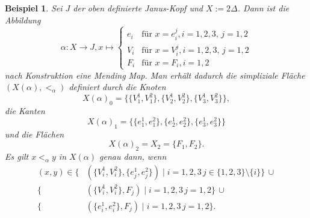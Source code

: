 \documentclass[12pt,titlepage,twoside,cleardoublepage]{article}
\theoremstyle{nummermitklammern}
\newtheorem{bsp}[temp]{Beispiel}
\newtheorem{bsp}[zahl]{Beispiel}
\numberwithin{equation}{section}
\begin{document}
  \begin{bsp}
  Sei $J$ der oben definierte Janus-Kopf und $X:= 2\Delta$. Dann ist die Abbildung 
  \[
  \alpha: X \to J, x \mapsto 
  \begin{cases}
e_i & \text{für } x =e_i^j ,i=1,2,3,\,j=1,2\\
V_i &\text{für } x =V_i^j,i=1,2,3,\,j=1,2\\
F_i &\text{für } x=F_i , i=1,2 
\end{cases}
  \]
  nach Konstruktion eine Mending Map. Man erhält dadurch die simpliziale Fläche $(X(\alpha),<_\alpha)$ definiert durch die Knoten
  \[
  X(\alpha)_0=\{\{V_1^1,V_1^2\},\{V_2^1,V_2^2\},\{V_3^1,V_3^2\}\},
  \]
  die Kanten
  \[
  X(\alpha)_1=\{\{e_1^1,e_1^2\},\{e_2^1,e_2^2\},\{e_3^1,e_3^2\}\}
  \]
  und die Flächen 
  \[
X(\alpha)_2=X_2=\{F_1,F_2\} .
  \]
  Es gilt $x<_{\alpha}y$ in $X(\alpha)$ genau dann, wenn
  \begin{align*}
 (x,y) \in \{&(\{V_i^1,V_i^2\}, \{e_j^1,e_j^2\})\mid i=1,2,3 \, j\in\{1,2,3\} \setminus \{i\}\}\, \cup\\
  \{&(\{V_i^1,V_i^2\}, F_j)\mid i=1,2,3 \, j=1,2 \} \,\cup\\
  \{&(\{e_i^1,e_i^2\}, F_j)\mid i=1,2,3 \, j=1,2 \}. 
\end{align*}
 \end{bsp}
\end{document}
